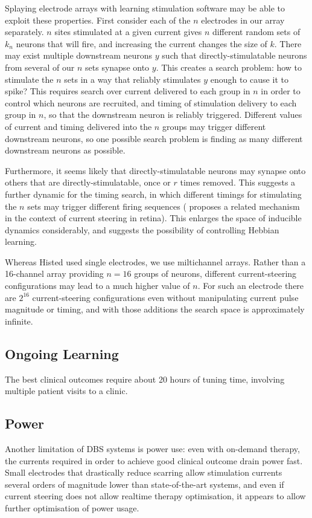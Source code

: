 \documentclass[10pt,letterpaper]{article}
\let\oldmarginpar\marginpar
\renewcommand{\marginpar}[1]{\oldmarginpar{\linespread{1}\scriptsize{#1}}}
\begin{document}
Splaying electrode arrays with learning stimulation software may be
able to exploit these properties.  First consider each of the $n$
electrodes in our array separately.  $n$ sites stimulated at a given
current gives $n$ different random sets of $k_n$ neurons that will
fire, and increasing the current changes the size of $k$.  There may
exist multiple downstream neurons $y$ such that directly-stimulatable
neurons from several of our $n$ sets synapse onto $y$.  This creates a
search problem: how to stimulate the $n$ sets in a way that reliably
stimulates $y$ enough to cause it to spike?  This requires search over
current delivered to each group in $n$ in order to control which
neurons are recruited, and timing of stimulation delivery to each
group in $n$, so that the downstream neuron is reliably triggered.
Different values of current and timing delivered into the $n$ groups
may trigger different downstream neurons, so one possible search problem is
finding as many different downstream neurons as possible.

Furthermore, it seems likely that directly-stimulatable neurons may
synapse onto others that are directly-stimulatable, once or $r$ times
removed.  This suggests a further dynamic for the timing search, in
which different timings for stimulating the $n$ sets may trigger
different firing sequences (\cite{Jepson2014steering_in_retina}
proposes a related mechanism in the context of current steering in
retina).  This enlarges the space of inducible dynamics considerably,
and suggests the possibility of controlling Hebbian learning.

Whereas Histed used single electrodes, we use miltichannel arrays.
Rather than a 16-channel array providing $n=16$ groups of neurons,
different current-steering configurations may lead to a much higher
value of $n$.  For such an electrode there are $2^{16}$
current-steering configurations even without manipulating current
pulse magnitude or timing, and with those additions the search space
is approximately infinite.

\subsection{Ongoing Learning}

The best clinical outcomes require about 20 hours\marginpar{Now where
  did I read this\dots?} of tuning time, involving multiple patient
visits to a clinic.

\subsection{Power}

Another limitation of DBS systems is power use: even with on-demand
therapy, the currents required in order to achieve good clinical
outcome drain power fast.  Small electrodes that drastically reduce
scarring allow stimulation currents several orders of magnitude lower
than state-of-the-art systems, and even if current steering does not
allow realtime therapy optimisation, it appears to allow further
optimisation of power usage.


\end{document}
